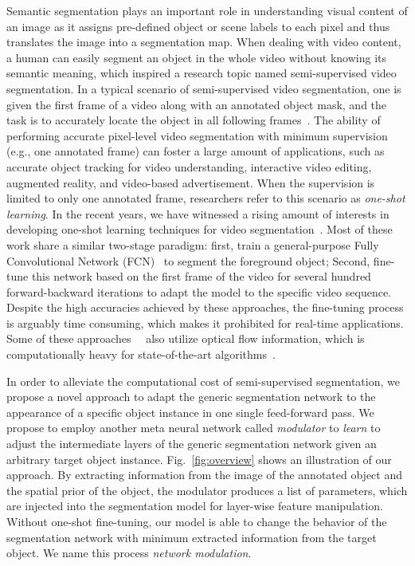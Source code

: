 \documentclass[10pt,twocolumn,letterpaper]{article}
\begin{document}
Semantic segmentation plays an important role in understanding visual content of an image as it assigns pre-defined object or scene labels to each pixel and thus translates the image into a segmentation map.
When dealing with video content, a human can easily segment an object in the whole video without knowing its semantic meaning, which inspired a research topic named semi-supervised video segmentation. In a typical scenario of semi-supervised video segmentation, one is given the first frame of a video along with an annotated object mask, and the task is to accurately locate the object in all following frames~\cite{Perazzi2016davis,Li2013video}.
The ability of performing accurate pixel-level video segmentation with minimum supervision (e.g., one annotated frame) can foster a large amount of applications, such as accurate object tracking for video understanding, interactive video editing, augmented reality, and video-based advertisement. When the supervision is limited to only one annotated frame, researchers refer to this scenario as \textit{one-shot learning}. In the recent years, we have witnessed a rising amount of interests in developing one-shot learning techniques for video segmentation~\cite{Caelles2017osvos, Perazzi2017masktrack, Tsai2016objflow, Marki2016bilateral, Shin2017pixel, Cheng2017segflow}. Most of these work share a similar two-stage paradigm: first, train a general-purpose Fully Convolutional Network (FCN)~\cite{shelhamer2017fully} to segment the foreground object; Second, fine-tune this network based on the first frame of the video for several hundred forward-backward iterations to adapt the model to the specific video sequence. Despite the high accuracies achieved by these approaches, the fine-tuning process is arguably time consuming, which makes it prohibited for real-time applications. Some of these approaches~\cite{Cheng2017segflow}~\cite{Perazzi2017masktrack} also utilize optical flow information, which is computationally heavy for state-of-the-art algorithms\cite{Revaud2015epicflow}~\cite{Ilg2017flownet}.

In order to alleviate the computational cost of semi-supervised segmentation, we propose a novel approach to adapt the generic segmentation network to the appearance of a specific object instance in one single feed-forward pass. We propose to employ another meta neural network called \emph{modulator} to \emph{learn} to adjust the intermediate layers of the generic segmentation network given an arbitrary target object instance. Fig.~\ref{fig:overview} shows an illustration of our approach. By extracting information from the image of the annotated object and the spatial prior of the object, the modulator produces a list of parameters, which are injected into the segmentation model for layer-wise feature manipulation. Without one-shot fine-tuning, our model is able to change the behavior of the segmentation network with minimum extracted information from the target object. We name this process \emph{network modulation}.  
\end{document}
